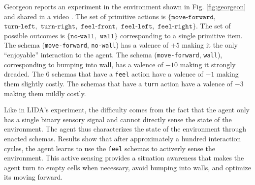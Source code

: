 \documentclass[runningheads]{llncs}
\begin{document}


Georgeon \cite{georgeon_intrinsically-motivated_2012} reports an experiment in the environment shown in Fig. \ref{fig:georgeon} and shared in a video \cite{georgeon_video_2012}.
The set of primitive actions is $\{ \texttt{move-forward},$ $\texttt{turn-left},$ $\texttt{turn-right},$ $\texttt{feel-front},$ $\texttt{feel-left},$ $\texttt{feel-right}\}$.
The set of possible outcomes is $\{ \texttt{no-wall},$ $ \texttt{wall} \}$ corresponding to a single primitive item. 
The schema (\texttt{move-forward}, \texttt{no-wall}) has a valence of $+5$ making it the only ``enjoyable'' interaction to the agent. 
The schema (\texttt{move-forward}, \texttt{wall}), corresponding to bumping into wall, has a valence of $-10$ making it strongly dreaded. 
The 6 schemas that have a \texttt{feel} action have a valence of $-1$ making them slightly costly. 
The schemas that have a \texttt{turn} action  have a valence of $-3$ making them mildly costly. 

Like in LIDA's experiment, the difficulty comes from the fact that the agent only has a single binary sensory signal and cannot directly sense the state of the environment. 
The agent thus characterizes the state of the environment through enacted schemas. 
Results show that after approximately a hundred interaction cycles, the agent learns to use the \texttt{feel} schemas to activerly sense the environment. 
This active sensing provides a situation awareness that makes the agent turn to empty cells when necessary, avoid bumping into walls, and optimize its moving forward. 
\end{document}
